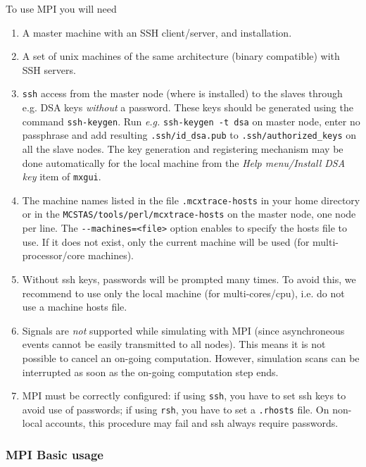To use MPI you will need
  \begin{enumerate}
  \item{A master machine with an SSH client/server, and \MCX installation.}
  \item{A set of unix machines of the same architecture (binary compatible) with SSH servers.}
  \item{ \texttt{ssh} access from the master node (where \MCX is
      installed) to the slaves through e.g. DSA keys \emph{without} a
      password. These keys should be generated using the command
      \texttt{ssh-keygen}. Run \emph{e.g.} \texttt{ssh-keygen -t dsa} on
      master node, enter no passphrase and add resulting
      \texttt{.ssh/id\_dsa.pub} to \texttt{.ssh/authorized\_keys}
      on all the slave nodes. The key generation and registering mechanism 
      may be done automatically for the local machine from the 
      \emph{Help menu/Install DSA key} item of \verb+mxgui+.}
  \item{The machine names listed in the file \texttt{.mcxtrace-hosts} in
      your home directory or in the \texttt{MCSTAS/tools/perl/mcxtrace-hosts} on
      the master node, one node per line. The \verb'--machines=<file>' option
      enables to specify the hosts file to use. If it does not exist, only 
      the current machine will be used (for multi-processor/core machines).}
  \item{Without ssh keys, passwords will be prompted many times. To avoid this, 
      we recommend to use only the local machine (for multi-cores/cpu), i.e. do
      not use a machine hosts file.}
  \item Signals are \emph{not} supported while simulating with MPI (since
    asynchroneous events cannot be easily transmitted to all nodes). This
    means it is not possible to cancel an on-going computation. However, 
    simulation scans can be interrupted as soon as the on-going computation 
    step ends.
  \item MPI must be correctly configured: if using \verb'ssh', you
    have to set ssh keys to avoid use of passwords; if
    using \verb'rsh', you have to set a \verb'.rhosts' file.
    On non-local accounts, this procedure may fail and ssh always require passwords.
  \end{enumerate}

\subsubsection{MPI Basic usage}

